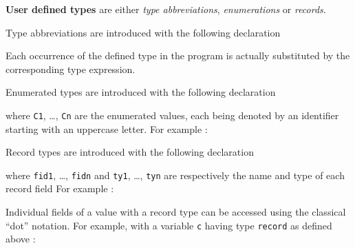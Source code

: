 \bigskip
\textbf{User defined types} are either \emph{type abbreviations}, \emph{enumerations} or
\emph{records}.

\step Type abbreviations are introduced with the following declaration
\begin{center}
\end{center}
Each occurrence of the defined type in the program is actually substituted by the corresponding type
expression.

\medskip
\step Enumerated types  are introduced with the following declaration
\begin{center}
\end{center}
where \verb|C1|, \ldots, \verb|Cn| are the enumerated values, each being denoted by an identifier
starting with an uppercase letter. For example : 
\begin{center}
\end{center}

\medskip
\step Record types are introduced with the following declaration
\begin{center}
\end{center}
where \verb|fid1|, \ldots, \verb|fidn| and \verb|ty1|, \ldots, \verb|tyn| are respectively the name
and type of each record field For example : 
\begin{center}
\end{center}

Individual fields of a value with a record type can be accessed using the classical ``dot''
notation. For example, with a variable \verb|c| having type \verb|record| as defined above :
\begin{center}
\end{center}

